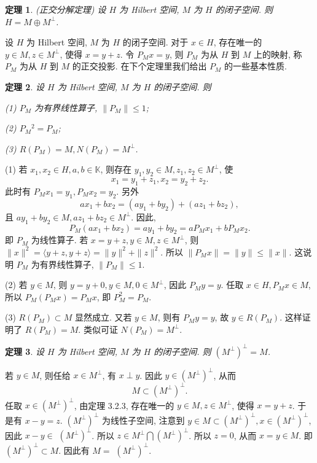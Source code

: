 \documentclass[openany]{ctexbook}
\makeatletter
\theoremstyle{kaiti}
\newtheorem{theorem}{定理}[section]
\theoremstyle{normal}
\renewenvironment{proof}[1][\proofname]{\par
    \pushQED{\qed}%
    \normalfont \topsep6\p@\@plus6\p@\relax
    \trivlist
    \item\relax
    {\heiti #1}\hspace{2\labelsep}\ignorespaces
  }{%
    \popQED\endtrivlist\@endpefalse
  }
\makeatother
\begin{document}
\begin{theorem}
  (正交分解定理) 设 $H$ 为 Hilbert 空间, $M$ 为 $H$ 的闭子空间. 则 $H=M \oplus M^{\perp}$.
\end{theorem}

设 $H$ 为 Hilbert 空间, $M$ 为 $H$ 的闭子空间. 对于 $x \in H$, 存在唯一的 $y \in M, z \in M^{\perp}$, 使得 $x=y+z$. 令 $P_{M} x=y$, 则 $P_{M}$ 为从 $H$ 到 $M$ 上的映射, 称 $P_{M}$ 为从 $H$ 到 $M$ 的正交投影. 在下个定理里我们给出 $P_{M}$ 的一些基本性质.

\begin{theorem}
设 $H$ 为 Hilbert 空间, $M$ 为 $H$ 的闭子空间. 则

(1) $P_{M}$ 为有界线性算子, $\left\|P_{M}\right\| \leqslant 1$;

(2) $P_{M}{ }^2=P_{M}$;

(3) $R\left(P_{M}\right)=M, N\left(P_{M}\right)=M^{\perp}$.
\end{theorem}

\begin{proof}
(1) 若 $x_1, x_2 \in H, a, b \in \mathbb{K}$, 则存在 $y_1, y_2 \in M, z_1, z_2 \in M^{\perp}$, 使
$$
x_1=y_1+z_1, x_2=y_2+z_2.
$$
此时有 $P_{M} x_1=y_1, P_{M} x_2=y_2$. 另外
$$
a x_1+b x_2=\left(a y_1+b y_2\right)+\left(a z_1+b z_2\right),
$$
且 $a y_1+b y_2 \in M, a z_1+b z_2 \in M^{\perp}$. 因此,
$$
P_{M}\left(a x_1+b x_2\right)=a y_1+b y_2=a P_{M} x_1+b P_{M} x_2.
$$
即 $P_{M}$ 为线性算子. 若 $x=y+z, y \in M, z \in M^{\perp}$, 则
$\|x\|^2=\langle y+z, y+z\rangle=\|y\|^2+\|z\|^2.$
所以 $\left\|P_{M} x\right\|=\|y\| \leqslant\|x\|$. 这说明 $P_{M}$ 为有界线性算子, $\left\|P_{M}\right\| \leqslant 1$.

(2) 若 $y \in M$, 则 $y=y+0, y \in M, 0 \in M^{\perp}$, 因此 $P_{M} y=y$. 任取 $x \in H, P_{M} x \in M$, 所以 $P_{M}\left(P_{M} x\right)=P_{M} x$, 即 $P_{M}^2=P_{M}$.

(3) $R\left(P_{M}\right) \subset M$ 显然成立. 又若 $y \in M$, 则有 $P_{M} y=y$, 故 $y \in R\left(P_{M}\right)$. 这样证明了 $R\left(P_{M}\right)=M$. 类似可证 $N\left(P_{M}\right)=M^{\perp}$.
\end{proof}

\begin{theorem}
  设 $H$ 为 Hilbert 空间, $M$ 为 $H$ 的闭子空间. 则 $\left(M^{\perp}\right)^{\perp}=M$. 
\end{theorem}

\begin{proof}
若 $y \in M$, 则任给 $x \in M^{\perp}$, 有 $x \perp y$. 因此 $y \in\left(M^{\perp}\right)^{\perp}$, 从而
$$
M \subset\left(M^{\perp}\right)^{\perp}.
$$
任取 $x \in\left(M^{\perp}\right)^{\perp}$, 由定理 3.2.3, 存在唯一的 $y \in M, z \in M^{\perp}$, 使得 $x=y+z$. 于是有 $x-y=z$. $\left(M^{\perp}\right)^{\perp}$ 为线性子空间, 注意到 $y \in M \subset\left(M^{\perp}\right)^{\perp}, x \in\left(M^{\perp}\right)^{\perp}$, 因此 $x-y \in$ $\left(M^{\perp}\right)^{\perp}$. 所以 $z \in M^{\perp} \bigcap\left(M^{\perp}\right)^{\perp}$. 所以 $z=0$, 从而 $x=y \in M$. 即 $\left(M^{\perp}\right)^{\perp} \subset M$. 因此有 $M=$ $\left(M^{\perp}\right)^{\perp}$.
\end{proof}
\end{document}
